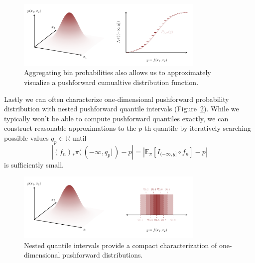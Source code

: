 \documentclass[
  letterpaper,
  DIV=11,
  numbers=noendperiod]{scrartcl}
\begin{document}
\begin{figure}

{\centering \includegraphics[width=0.8\textwidth,height=\textheight]{figures/pushforward_characterizations/cdf/cdf.pdf}

}

\caption{\label{fig-pushforward-characterizations-cdf}Aggregating bin
probabilities also allows us to approximately visualize a pushforward
cumualtive distribution function.}

\end{figure}

Lastly we can often characterize one-dimensional pushforward probability
distribution with nested pushforward quantile intervals
(Figure~\ref{fig-pushforward-characterizations-quantile-intervals}).
While we typically won't be able to compute pushforward quantiles
exactly, we can construct reasonable approximations to the \(p\)-th
quantile by iteratively searching possible values
\(q_{p} \in \mathbb{R}\) until \[
| (f_{n})_{*} \pi( \, (-\infty, q_{p}] \, ) - p |
=
| \mathbb{E}_{\pi} [ I_{(-\infty, y]} \circ f_{n} ] - p |
\] is sufficiently small.

\begin{figure}

{\centering \includegraphics[width=0.8\textwidth,height=\textheight]{figures/pushforward_characterizations/quantile_intervals/quantile_intervals.pdf}

}

\caption{\label{fig-pushforward-characterizations-quantile-intervals}Nested
quantile intervals provide a compact characterization of one-dimensional
pushforward distributions.}

\end{figure}
\end{document}
